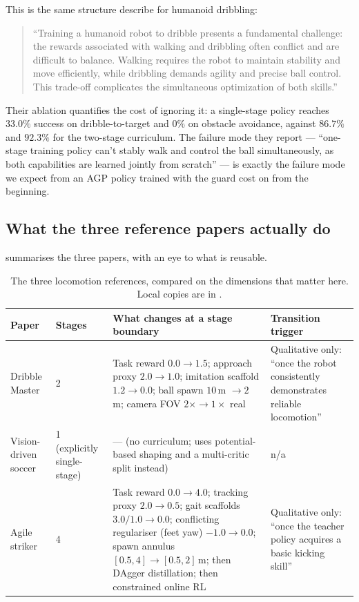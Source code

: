 \documentclass[11pt,a4paper]{article}
\begin{document}
This is the same structure \citet{wang2025dribble} describe for humanoid dribbling:

\begin{quote}\small
``Training a humanoid robot to dribble presents a fundamental challenge: the rewards
associated with walking and dribbling often conflict and are difficult to balance. Walking
requires the robot to maintain stability and move efficiently, while dribbling demands
agility and precise ball control. This trade-off complicates the simultaneous optimization
of both skills.''
\end{quote}

\noindent
Their ablation quantifies the cost of ignoring it: a single-stage policy reaches $33.0\%$
success on dribble-to-target and $0\%$ on obstacle avoidance, against $86.7\%$ and $92.3\%$
for the two-stage curriculum. The failure mode they report --- ``one-stage training policy
can't stably walk and control the ball simultaneously, as both capabilities are learned
jointly from scratch'' --- is exactly the failure mode we expect from an AGP policy trained
with the guard cost on from the beginning.

\subsection{What the three reference papers actually do}

 summarises the three papers, with an eye to what is reusable.

\begin{table}[t]
\centering
\small
\caption{The three locomotion references, compared on the dimensions that matter here.
Local copies are in .}
\label{tab:papers}
\begin{tabularx}{\linewidth}{@{}p{2.5cm} p{2.1cm} X p{2.5cm}@{}}
\toprule
\textbf{Paper} & \textbf{Stages} & \textbf{What changes at a stage boundary} & \textbf{Transition trigger} \\
\midrule
Dribble Master \cite{wang2025dribble}
& 2
& Task reward $0.0 \to 1.5$; approach proxy $2.0 \to 1.0$; imitation scaffold $1.2 \to 0.0$;
  ball spawn $10$\,m $\to 2$\,m; camera FOV $2\times \to 1\times$ real
& Qualitative only: ``once the robot consistently demonstrates reliable locomotion'' \\
\addlinespace
Vision-driven soccer \cite{wang2025vision}
& 1 (explicitly single-stage)
& --- (no curriculum; uses potential-based shaping and a multi-critic split instead)
& n/a \\
\addlinespace
Agile striker \cite{xu2025striker}
& 4
& Task reward $0.0 \to 4.0$; tracking proxy $2.0 \to 0.5$; gait scaffolds $3.0/1.0 \to 0.0$;
  conflicting regulariser (feet yaw) $-1.0 \to 0.0$; spawn annulus $[0.5,4]\to[0.5,2]$\,m;
  then DAgger distillation; then constrained online RL
& Qualitative only: ``once the teacher policy acquires a basic kicking skill'' \\
\bottomrule
\end{tabularx}
\end{table}
\end{document}
